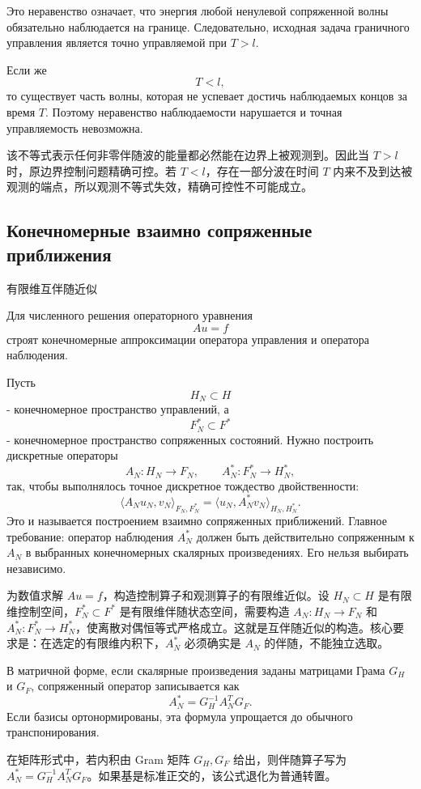 \documentclass[12pt,a4paper]{article}
\newcommand{\zh}[1]{\par\noindent #1\par}
\begin{document}

Это неравенство означает, что энергия любой ненулевой сопряженной волны обязательно наблюдается на границе. Следовательно, исходная задача граничного управления является точно управляемой при $T>l$.

Если же
\[
 T<l,
\]
то существует часть волны, которая не успевает достичь наблюдаемых концов за время $T$. Поэтому неравенство наблюдаемости нарушается и точная управляемость невозможна.
\zh{该不等式表示任何非零伴随波的能量都必然能在边界上被观测到。因此当 \(T>l\) 时，原边界控制问题精确可控。若 \(T<l\)，存在一部分波在时间 \(T\) 内来不及到达被观测的端点，所以观测不等式失效，精确可控性不可能成立。}

\subsection*{Конечномерные взаимно сопряженные приближения}
\zh{有限维互伴随近似}
Для численного решения операторного уравнения
\[
 Au=f
\]
строят конечномерные аппроксимации оператора управления и оператора наблюдения.

Пусть
\[
 H_N\subset H
\]
- конечномерное пространство управлений, а
\[
 F_N^*\subset F^*
\]
- конечномерное пространство сопряженных состояний. Нужно построить дискретные операторы
\[
 A_N:H_N\to F_N,
 \qquad
 A_N^*:F_N^*\to H_N^*,
\]
так, чтобы выполнялось точное дискретное тождество двойственности:
\[
 \langle A_Nu_N,v_N\rangle_{F_N,F_N^*}
 =
 \langle u_N,A_N^*v_N\rangle_{H_N,H_N^*}.
\]
Это и называется построением взаимно сопряженных приближений. Главное требование: оператор наблюдения $A_N^*$ должен быть действительно сопряженным к $A_N$ в выбранных конечномерных скалярных произведениях. Его нельзя выбирать независимо.
\zh{为数值求解 \(Au=f\)，构造控制算子和观测算子的有限维近似。设 \(H_N\subset H\) 是有限维控制空间，\(F_N^*\subset F^*\) 是有限维伴随状态空间，需要构造 \(A_N:H_N\to F_N\) 和 \(A_N^*:F_N^*\to H_N^*\)，使离散对偶恒等式严格成立。这就是互伴随近似的构造。核心要求是：在选定的有限维内积下，\(A_N^*\) 必须确实是 \(A_N\) 的伴随，不能独立选取。}


В матричной форме, если скалярные произведения заданы матрицами Грама $G_H$ и $G_F$, сопряженный оператор записывается как
\[
 A_N^*=G_H^{-1}A_N^T G_F.
\]
Если базисы ортонормированы, эта формула упрощается до обычного транспонирования.
\zh{在矩阵形式中，若内积由 Gram 矩阵 \(G_H,G_F\) 给出，则伴随算子写为 \(A_N^*=G_H^{-1}A_N^T G_F\)。如果基是标准正交的，该公式退化为普通转置。}
\end{document}
